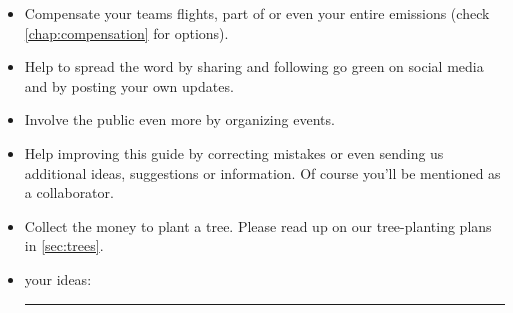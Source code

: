 {\begin{checklistbox}
\begin{itemize}
	\item Compensate your teams flights, part of or even your entire emissions (check \cref{chap:compensation} for options).
	\item Help to spread the word by sharing and following go green on social media and by posting your own updates.
	\item Involve the public even more by organizing events.
	\item Help improving this guide by correcting mistakes or even sending us additional ideas, suggestions or information. Of course you'll be mentioned as a collaborator.
	\item Collect the money to plant a tree. Please read up on our tree-planting plans in \cref{sec:trees}.
	\item your ideas: {\leavevmode\leaders\hrule  height -1.9pt depth 2pt \hfill\kern0pt\relax}
\end{itemize}
\end{checklistbox}
}
